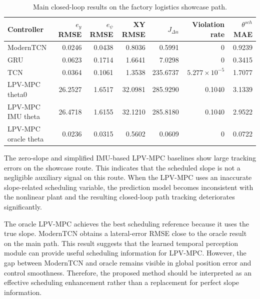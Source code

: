 \documentclass{ieeeaccess}
\begin{document}
\begin{table}[t]

\centering

\caption{Main closed-loop results on the factory logistics showcase path.}

\label{tab:main_closed_loop}

\begin{tabular}{lrrrrrr}

\hline

Controller & $e_y$ RMSE & $e_{\psi}$ RMSE & XY RMSE & $J_{\Delta u}$ & Violation rate & $\theta^{sch}$ MAE \\

\hline

ModernTCN & 0.0246 & 0.0438 & 0.8036 & 0.5991 & 0 & 0.9239 \\

GRU & 0.0623 & 0.1714 & 1.6641 & 7.0298 & 0 & 0.3415 \\

TCN & 0.0364 & 0.1061 & 1.3538 & 235.6737 & $5.277\times 10^{-5}$ & 1.7077 \\

LPV-MPC theta0 & 26.2527 & 1.6517 & 32.0981 & 285.9290 & 0.1040 & 3.1339 \\

LPV-MPC IMU theta & 26.4718 & 1.6155 & 32.1210 & 285.8180 & 0.1040 & 2.9522 \\

LPV-MPC oracle theta & 0.0236 & 0.0315 & 0.5602 & 0.0609 & 0 & 0.0722 \\

\hline

\end{tabular}

\end{table}



The zero-slope and simplified IMU-based LPV-MPC baselines show large tracking errors on the showcase route. This indicates that the scheduled slope is not a negligible auxiliary signal on this route. When the LPV-MPC uses an inaccurate slope-related scheduling variable, the prediction model becomes inconsistent with the nonlinear plant and the resulting closed-loop path tracking deteriorates significantly.



The oracle LPV-MPC achieves the best scheduling reference because it uses the true slope. ModernTCN obtains a lateral-error RMSE close to the oracle result on the main path. This result suggests that the learned temporal perception module can provide useful scheduling information for LPV-MPC. However, the gap between ModernTCN and oracle remains visible in global position error and control smoothness. Therefore, the proposed method should be interpreted as an effective scheduling enhancement rather than a replacement for perfect slope information.
\end{document}
